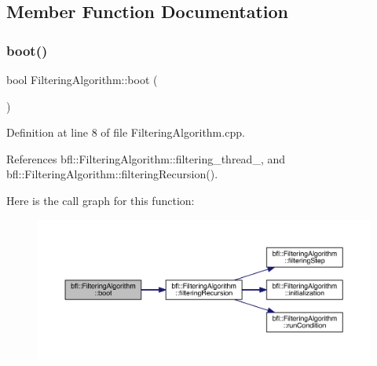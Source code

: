 \subsection{Member Function Documentation}
\mbox{\label{classbfl_1_1FilteringAlgorithm_a96651f8464190c0a56d79219a1017147}} 
\subsubsection{\texorpdfstring{boot()}{boot()}}
{\footnotesize\ttfamily bool Filtering\+Algorithm\+::boot (\begin{DoxyParamCaption}{ }\end{DoxyParamCaption})\hspace{0.3cm}{\ttfamily [inherited]}}



Definition at line 8 of file Filtering\+Algorithm.\+cpp.



References bfl\+::\+Filtering\+Algorithm\+::filtering\+\_\+thread\+\_\+, and bfl\+::\+Filtering\+Algorithm\+::filtering\+Recursion().

Here is the call graph for this function\+:
\nopagebreak
\begin{figure}[H]
\begin{center}
\leavevmode
\includegraphics[width=350pt]{classbfl_1_1FilteringAlgorithm_a96651f8464190c0a56d79219a1017147_cgraph}
\end{center}
\end{figure}
\mbox{\label{classbfl_1_1Logger_a440467a28ccc46490d767fe0ef6f556a}} 
